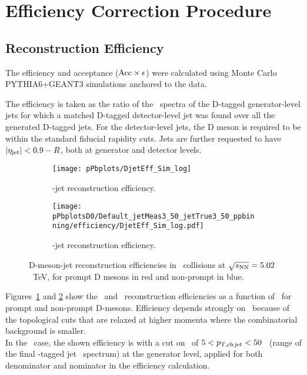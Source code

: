 \section{Efficiency Correction Procedure}

\subsection{Reconstruction Efficiency}
\label{sect:sub_DmesonRecEff}
The efficiency and acceptance (${\rm Acc} \times \epsilon$) were calculated using Monte Carlo PYTHIA6+GEANT3 simulations anchored to the data.

The efficiency is taken as the ratio of the \ptd\ spectra of the D-tagged generator-level jets for which a matched
D-tagged detector-level jet was found over all the generated D-tagged jets.
For the detector-level jets, the D meson is required to be within the standard fiducial rapidity cuts.
Jets are further requested to have $|\eta_{\rm jet}| < 0.9 - R$, both at generator and detector levels.

\begin{figure}[bth]
\centering
\begin{subfigure}[c]{0.49\textwidth}
\texttt{[image: pPbplots/DjetEff\_Sim\_log]}
\caption{\Dstar-jet  reconstruction efficiency.}
\label{eq_pPb_DrecEff_Dstar}
\end{subfigure}
\begin{subfigure}[d]{0.49\textwidth}
\texttt{[image: pPbplotsD0/Default\_jetMeas3\_50\_jetTrue3\_50\_ppbinning/efficiency/DjetEff\_Sim\_log.pdf]}
\caption{\Dzero-jet  reconstruction efficiency.}
\label{eq_pPb_DrecEff_Dzero}
\end{subfigure}
\caption{D-meson-jet reconstruction efficiencies in \pPb\ collisions at $\sqrt{s_{\rm NN}}=5.02$~TeV, for prompt D mesons in red and non-prompt in blue.}
\label{fig:eq_pPb_DrecEff}
\end{figure}

Figures~\ref{eq_pPb_DrecEff_Dstar} and \ref{eq_pPb_DrecEff_Dzero} show the \Dstar\ and \Dzero\ reconstruction efficiencies as a function of \ptd\, 
for prompt and non-prompt D-mesons. Efficiency depends strongly on \ptd\ because of the topological cuts that are relaxed at higher momenta where the combinatorial background is smaller. 
\\In the \Dzero\ case, the shown efficiency is with a cut on \ptchjet\ of $5 < p_{\mathrm{T,ch\, jet}} < 50$ \GeVc\ (range of the final \Dzero-tagged jet \pt\ spectrum) at the generator level, applied for both denominator and nominator in the efficiency calculation.

